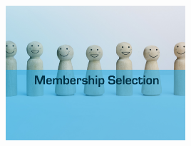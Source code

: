 \documentclass{article}
\begin{document}
\vspace{1cm}

\begin{center}
    \includegraphics[width=0.5\textwidth]{photo_1.jpg}
\end{center}
\end{document}

